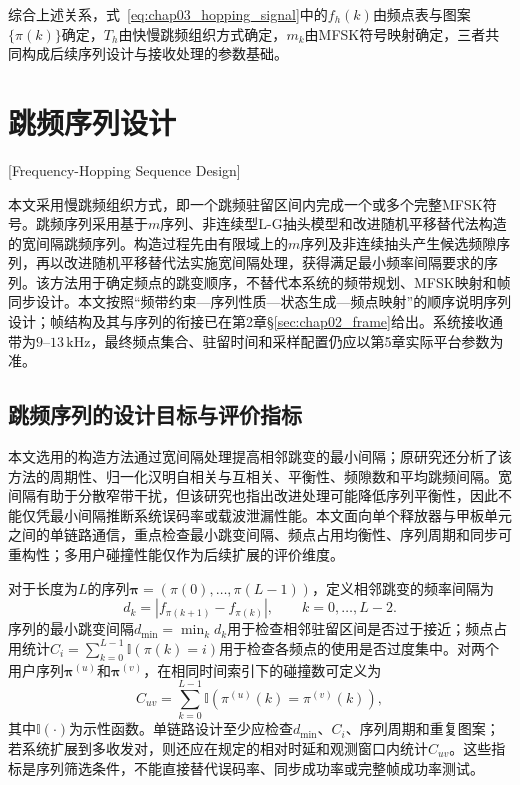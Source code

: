 综合上述关系，式~\eqref{eq:chap03_hopping_signal}中的$f_h(k)$由频点表与图案$\{\pi(k)\}$确定，$T_h$由快慢跳频组织方式确定，$m_k$由MFSK符号映射确定，三者共同构成后续序列设计与接收处理的参数基础。

\section{跳频序列设计}[Frequency-Hopping Sequence Design]

本文采用慢跳频组织方式，即一个跳频驻留区间内完成一个或多个完整MFSK符号。跳频序列采用基于$m$序列、非连续型L-G抽头模型和改进随机平移替代法构造的宽间隔跳频序列\cite{FengJianLiYiLeiGaiJinDeSuiJiPingYiTiDaiFaGouZaoDeKuanJianGeTiaoPinXuLie2013}。构造过程先由有限域上的$m$序列及非连续抽头产生候选频隙序列，再以改进随机平移替代法实施宽间隔处理，获得满足最小频率间隔要求的序列。该方法用于确定频点的跳变顺序，不替代本系统的频带规划、MFSK映射和帧同步设计。本文按照“频带约束—序列性质—状态生成—频点映射”的顺序说明序列设计；帧结构及其与序列的衔接已在第2章\S\ref{sec:chap02_frame}给出。系统接收通带为$9$--$13\,\mathrm{kHz}$，最终频点集合、驻留时间和采样配置仍应以第5章实际平台参数为准。

\subsection{跳频序列的设计目标与评价指标}

本文选用的构造方法通过宽间隔处理提高相邻跳变的最小间隔；原研究还分析了该方法的周期性、归一化汉明自相关与互相关、平衡性、频隙数和平均跳频间隔\cite{FengJianLiYiLeiGaiJinDeSuiJiPingYiTiDaiFaGouZaoDeKuanJianGeTiaoPinXuLie2013}。宽间隔有助于分散窄带干扰，但该研究也指出改进处理可能降低序列平衡性，因此不能仅凭最小间隔推断系统误码率或载波泄漏性能。本文面向单个释放器与甲板单元之间的单链路通信，重点检查最小跳变间隔、频点占用均衡性、序列周期和同步可重构性；多用户碰撞性能仅作为后续扩展的评价维度\cite{SongDongPoTiaoPinXuLieSheJiYanJiuXianZhuangYuWeiLaiFaZhan2024}。

对于长度为$L$的序列$\boldsymbol{\pi}=(\pi(0),\ldots,\pi(L-1))$，定义相邻跳变的频率间隔为
\begin{equation}
 d_k=|f_{\pi(k+1)}-f_{\pi(k)}|,\qquad k=0,\ldots,L-2 .
\label{eq:chap03_adjacent_spacing}
\end{equation}
序列的最小跳变间隔$d_{\min}=\min_k d_k$用于检查相邻驻留区间是否过于接近；频点占用统计$C_i=\sum_{k=0}^{L-1}\mathbb{I}(\pi(k)=i)$用于检查各频点的使用是否过度集中。对两个用户序列$\boldsymbol{\pi}^{(u)}$和$\boldsymbol{\pi}^{(v)}$，在相同时间索引下的碰撞数可定义为
\begin{equation}
 C_{uv}=\sum_{k=0}^{L-1}\mathbb{I}\!\left(\pi^{(u)}(k)=\pi^{(v)}(k)\right),
\label{eq:chap03_collision_count}
\end{equation}
其中$\mathbb{I}(\cdot)$为示性函数。单链路设计至少应检查$d_{\min}$、$C_i$、序列周期和重复图案；若系统扩展到多收发对，则还应在规定的相对时延和观测窗口内统计$C_{uv}$。这些指标是序列筛选条件，不能直接替代误码率、同步成功率或完整帧成功率测试。

